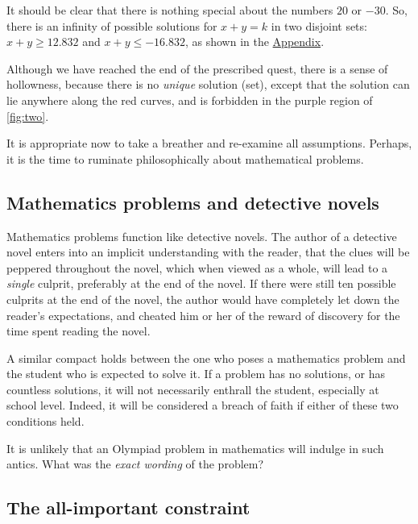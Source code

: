 \documentclass[
  a4paper,
]{article}
\begin{document}
It should be clear that there is nothing special about the numbers
\(20\) or \(-30\). So, there is an infinity of possible solutions for
\(x + y = k\) in two disjoint sets: \(x + y \geq 12.832\) and
\(x + y \leq -16.832\), as shown in the
\protect\hyperlink{appendix}{Appendix}.

Although we have reached the end of the prescribed quest, there is a
sense of hollowness, because there is no \emph{unique} solution (set),
except that the solution can lie anywhere along the red curves, and is
forbidden in the purple region of \cref{fig:two}.

It is appropriate now to take a breather and re-examine all assumptions.
Perhaps, it is the time to ruminate philosophically about mathematical
problems.

\hypertarget{mathematics-problems-and-detective-novels}{%
\subsection{Mathematics problems and detective
novels}\label{mathematics-problems-and-detective-novels}}

Mathematics problems function like detective novels. The author of a
detective novel enters into an implicit understanding with the reader,
that the clues will be peppered throughout the novel, which when viewed
as a whole, will lead to a \emph{single} culprit, preferably at the end
of the novel. If there were still ten possible culprits at the end of
the novel, the author would have completely let down the reader's
expectations, and cheated him or her of the reward of discovery for the
time spent reading the novel.

A similar compact holds between the one who poses a mathematics problem
and the student who is expected to solve it. If a problem has no
solutions, or has countless solutions, it will not necessarily enthrall
the student, especially at school level. Indeed, it will be considered a
breach of faith if either of these two conditions held.

It is unlikely that an Olympiad problem in mathematics will indulge in
such antics. What was the \emph{exact wording} of the problem?

\hypertarget{the-all-important-constraint}{%
\subsection{The all-important
constraint}\label{the-all-important-constraint}}
\end{document}
